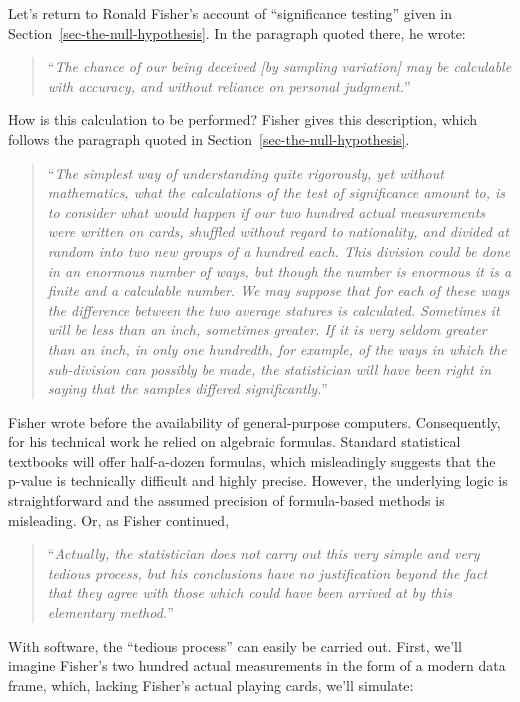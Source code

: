 \documentclass[
  letterpaper,
  DIV=11,
  numbers=noendperiod,
  oneside]{scrartcl}
\begin{document}
Let's return to Ronald Fisher's account of ``significance testing''
given in Section~\ref{sec-the-null-hypothesis}. In the paragraph quoted
there, he wrote:

\begin{quote}
``\emph{The chance of our being deceived {[}by sampling variation{]} may
be calculable with accuracy, and without reliance on personal
judgment.}''
\end{quote}

How is this calculation to be performed? Fisher gives this description,
which follows the paragraph quoted in
Section~\ref{sec-the-null-hypothesis}.

\begin{quote}
``\emph{The simplest way of understanding quite rigorously, yet without
mathematics, what the calculations of the test of significance amount
to, is to consider what would happen if our two hundred actual
measurements were written on cards, shuffled without regard to
nationality, and divided at random into two new groups of a hundred
each. This division could be done in an enormous number of ways, but
though the number is enormous it is a finite and a calculable number. We
may suppose that for each of these ways the difference between the two
average statures is calculated. Sometimes it will be less than an inch,
sometimes greater. If it is very seldom greater than an inch, in only
one hundredth, for example, of the ways in which the sub-division can
possibly be made, the statistician will have been right in saying that
the samples differed significantly.}''
\end{quote}

Fisher wrote before the availability of general-purpose computers.
Consequently, for his technical work he relied on algebraic formulas.
Standard statistical textbooks will offer half-a-dozen formulas, which
misleadingly suggests that the p-value is technically difficult and
highly precise. However, the underlying logic is straightforward and the
assumed precision of formula-based methods is misleading. Or, as Fisher
continued,

\begin{quote}
``\emph{Actually, the statistician does not carry out this very simple
and very tedious process, but his conclusions have no justification
beyond the fact that they agree with those which could have been arrived
at by this elementary method.}''
\end{quote}

With software, the ``tedious process'' can easily be carried out. First,
we'll imagine Fisher's two hundred actual measurements in the form of a
modern data frame, which, lacking Fisher's actual playing cards, we'll
simulate:
\end{document}
